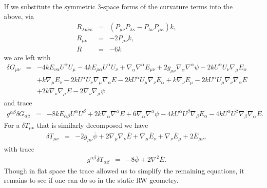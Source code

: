 \documentclass[10pt,letterpaper]{article}
\numberwithin{equation}{section}
\begin{document}
If we substitute the symmetric 3-space forms of the curvature terms into the above, via
\begin{eqnarray}
R_{\lambda\mu\nu\kappa} &=& (P_{\mu\nu}P_{\lambda\kappa}-P_{\lambda\nu}P_{\mu\kappa})k,
\nonumber\\
R_{\mu\nu} &=& -2 P_{\mu\nu}k,
\nonumber\\
R&=& -6k
\end{eqnarray}
we are left with
\begin{eqnarray}
\delta G_{\mu\nu}&=&-4 k E_{\nu \alpha} U^{\alpha} U_{\mu}
- 4 k E_{\mu \alpha} U^{\alpha} U_{\nu}
+ \nabla_{\alpha}\nabla^{\alpha}E_{\mu \nu}
+ 2 g_{\mu \nu} \nabla_{\alpha}\nabla^{\alpha}\psi
- 2 k U^{\alpha} U_{\nu} \nabla_{\mu}E_{\alpha}\nonumber\\
&& + k \nabla_{\mu}E_{\nu}
- 2 k U^{\alpha} U_{\nu} \nabla_{\mu}\nabla_{\alpha}E
- 2 k U^{\alpha} U_{\mu} \nabla_{\nu}E_{\alpha}
+ k \nabla_{\nu}E_{\mu}
- 2 k U^{\alpha} U_{\mu} \nabla_{\nu}\nabla_{\alpha}E\nonumber\\
&& + 2 k \nabla_{\nu}\nabla_{\mu}E
- 2 \nabla_{\nu}\nabla_{\mu}\psi
\end{eqnarray}
and trace
\begin{eqnarray}
g^{\alpha\beta}\delta G_{\alpha\beta}&=&-8 k E_{\alpha \beta} U^{\alpha} U^{\beta}
+ 2 k \nabla_{\alpha}\nabla^{\alpha}E
+ 6 \nabla_{\alpha}\nabla^{\alpha}\psi
- 4 k U^{\alpha} U^{\beta} \nabla_{\beta}E_{\alpha}
- 4 k U^{\alpha} U^{\beta} \nabla_{\beta}\nabla_{\alpha}E.
\end{eqnarray}
For a $\delta T_{\mu\nu}$ that is similarly decomposed we have
\begin{eqnarray}
\delta T_{\mu\nu}&=& -2 g_{\mu\nu}\bar\psi + 2\nabla_\mu\nabla_\nu \bar E +\nabla_\mu \bar E_\nu + \nabla_\nu \bar E_\mu + 2\bar E_{\mu\nu},
\end{eqnarray}
with trace 
\begin{eqnarray}
g^{\alpha\beta}\delta T_{\alpha\beta} &=& -8\bar\psi + 2\nabla^2 \bar E.
\end{eqnarray}
Though in flat space the trace allowed us to simplify the remaining equations, it remains to see if one can do so in the static RW geometry. 
\end{document}
